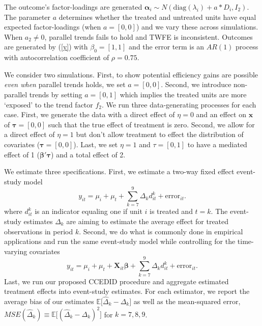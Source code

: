 \documentclass[12pt,fleqn]{article}
\def\*#1{\mathbf{#1}}
\def\+#1{\boldsymbol{#1}}
\begin{document}
The outcome's factor-loadings are generated $\+\alpha_i \sim N(\text{diag}(\lambda_i) + a * D_i, I_2)$. The parameter $a$ determines whether the treated and untreated units have equal expected factor-loadings (when $a = [0, 0]$) and we vary these across simulations. When $a_2 \neq 0$, parallel trends fails to hold and TWFE is inconsistent.  Outcomes are generated by (\ref{y}) with $\beta_0 = [1, 1]$ and the error term is an $AR(1)$ process with autocorrelation coefficient of $\rho = 0.75$.

We consider two simulations. First, to show potential efficiency gains are possible \emph{even when} parallel trends holds, we set $a = [0, 0]$. Second, we introduce non-parallel trends by setting $a = [0, 1]$ which implies the treated units are more `exposed' to the trend factor $f_2$. We run three data-generating processes for each case. First, we generate the data with a direct effect of $\eta = 0$ and an effect on $\*x$ of $\+\tau = [0, 0]$ such that the true effect of treatment is zero. Second, we allow for a direct effect of $\eta = 1$ but don't allow treatment to effect the distribution of covariates ($\+\tau = [0, 0]$). Last, we set $\eta = 1$ and $\tau = [0, 1]$ to have a mediated effect of 1 ($\+\beta' \+\tau$) and a total effect of 2.

We estimate three specifications. First, we estimate a two-way fixed effect event-study model 
\begin{equation}\label{eq:monte_twfe} 
    y_{it} = \mu_i + \mu_t + \sum_{k=7}^9 \Delta_{k} d_{it}^k + \text{error}_{it}.
\end{equation}
where $d_{it}^k$ is an indicator equaling one if unit $i$ is treated and $t = k$. The event-study estimates $\Delta_{k}$ are aiming to estimate the average effect for treated observations in period $k$. Second, we do what is commonly done in empirical applications and run the same event-study model while controlling for the time-varying covariates 
\begin{equation}\label{eq:monte_twfe_cov} 
    y_{it} = \mu_i + \mu_t + \bm X_{it} \bm \beta + \sum_{k=7}^9 \Delta_{k} d_{it}^k + \text{error}_{it}.
\end{equation}
Last, we run our proposed CCEDID procedure and aggregate estimated treatment effects into event-study estimates. For each estimator, we report the average bias of our estimates $\mathbb{E}\big[ \widehat{\Delta}_k - \Delta_k \big]$ as well as the mean-squared error, $MSE(\widehat{\Delta}_k) \equiv \mathbb{E}\big[ (\widehat{\Delta}_k - \Delta_k)^2 \big]$ for $k = 7,8,9$.
\end{document}
